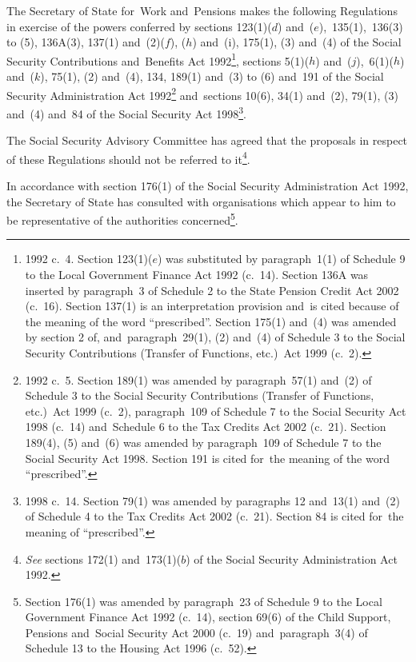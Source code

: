 \documentclass[12pt,a4paper]{article}
\title{\regstitle}
\author{S.I.\ 2008 No.\ 1042}
\date{Made
7th April 2008\\
Laid before Parliament
11th April 2008\\
Coming into~force
in accordance with regulation~1
}
\begin{document}
\maketitle

\noindent
The Secretary of State for~Work and~Pensions makes the following Regulations in exercise of the powers conferred by sections 123(1)($d$)  and~($e$),~135(1),~136(3) to (5), 136A(3), 137(1) and~(2)($f$), ($h$)  and~(i), 175(1), (3) and~(4) of the Social Security Contributions and~Benefits Act 1992\footnote{1992 c.~4. Section 123(1)($e$)  was substituted by paragraph~1(1) of Schedule 9 to the Local Government Finance Act 1992 (c.~14). Section 136A was inserted by paragraph~3 of Schedule 2 to the State Pension Credit Act 2002 (c.~16). Section 137(1) is an interpretation provision and~is cited because of the meaning of the word “prescribed”. Section 175(1) and~(4) was amended by section 2 of, and~paragraph~29(1), (2) and~(4) of Schedule 3 to the Social Security Contributions (Transfer of Functions, etc.)\ Act 1999 (c.~2).}, sections 5(1)($h$)  and~($j$),~6(1)($h$)  and~($k$), 75(1), (2) and~(4), 134, 189(1) and~(3) to (6) and~191 of the Social Security Administration Act 1992\footnote{1992 c.~5. Section 189(1) was amended by paragraph~57(1) and~(2) of Schedule 3 to the Social Security Contributions (Transfer of Functions, etc.)\ Act 1999 (c.~2), paragraph~109 of Schedule 7 to the Social Security Act 1998 (c.~14) and~Schedule 6 to the Tax Credits Act 2002 (c.~21). Section 189(4), (5) and~(6) was amended by paragraph~109 of Schedule 7 to the Social Security Act 1998. Section 191 is cited for~the meaning of the word “prescribed”.} and~sections 10(6), 34(1) and~(2), 79(1), (3) and~(4) and~84 of the Social Security Act 1998\footnote{1998 c.~14. Section 79(1) was amended by paragraphs 12 and~13(1) and~(2) of Schedule 4 to the Tax Credits Act 2002 (c.~21). Section 84 is cited for~the meaning of “prescribed”.}.

The Social Security Advisory Committee has agreed that the proposals in respect of these Regulations should not be referred to it\footnote{\emph{See} sections 172(1) and~173(1)($b$)  of the Social Security Administration Act 1992.}.

\enlargethispage{-\baselineskip}

In accordance with section 176(1) of the Social Security Administration Act 1992, the Secretary of State has consulted with organisations which appear to him to be representative of the authorities concerned\footnote{Section 176(1) was amended by paragraph~23 of Schedule 9 to the Local Government Finance Act 1992 (c.~14), section 69(6) of the Child Support, Pensions and~Social Security Act 2000 (c.~19) and~paragraph~3(4) of Schedule 13 to the Housing Act 1996 (c.~52).}. 
\end{document}
